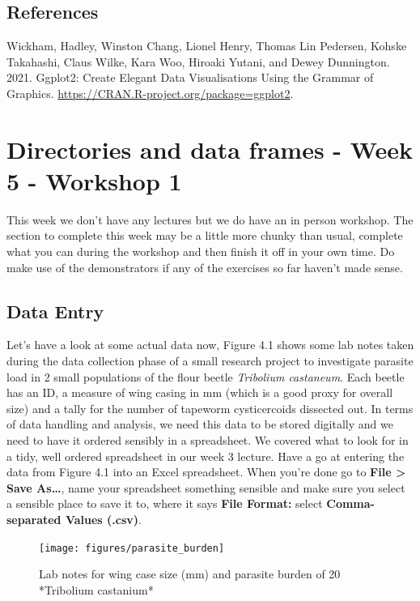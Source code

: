 \documentclass[
]{book}
\begin{document}
\section{References}\label{references}

Wickham, Hadley, Winston Chang, Lionel Henry, Thomas Lin Pedersen, Kohske Takahashi, Claus Wilke, Kara Woo, Hiroaki Yutani, and Dewey Dunnington. 2021. Ggplot2: Create Elegant Data Visualisations Using the Grammar of Graphics. \url{https://CRAN.R-project.org/package=ggplot2}.

\chapter{Directories and data frames - Week 5 - Workshop 1}\label{data-frames}

This week we don't have any lectures but we do have an in person workshop. The section to complete this week may be a little more chunky than usual, complete what you can during the workshop and then finish it off in your own time. Do make use of the demonstrators if any of the exercises so far haven't made sense.

\section{Data Entry}\label{data-entry}

Let's have a look at some actual data now, Figure 4.1 shows some lab notes taken during the data collection phase of a small research project to investigate parasite load in 2 small populations of the flour beetle \emph{Tribolium castaneum}. Each beetle has an ID, a measure of wing casing in mm (which is a good proxy for overall size) and a tally for the number of tapeworm cysticercoids dissected out. In terms of data handling and analysis, we need this data to be stored digitally and we need to have it ordered sensibly in a spreadsheet. We covered what to look for in a tidy, well ordered spreadsheet in our week 3 lecture. Have a go at entering the data from Figure 4.1 into an Excel spreadsheet. When you're done go to \textbf{File \textgreater{} Save As\ldots{}}, name your spreadsheet something sensible and make sure you select a sensible place to save it to, where it says \textbf{File Format:} select \textbf{Comma-separated Values (.csv)}.

\begin{figure}
\texttt{[image: figures/parasite\_burden]} \caption{Lab notes for wing case size (mm) and parasite burden of 20 *Tribolium castanium*}\label{fig:unnamed-chunk-25}
\end{figure}
\end{document}
